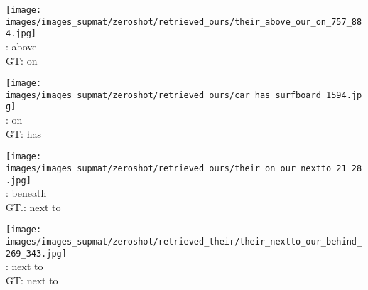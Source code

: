 \documentclass[10pt,twocolumn,letterpaper]{article}
\begin{document}
\begin{figure*}[t]
    \begin{minipage}[t]{0.185\textwidth}
    	\centering
       	\texttt{[image: images/images\_supmat/zeroshot/retrieved\_ours/their\_above\_our\_on\_757\_884.jpg]}\\
       	\vspace{0.3ex}
       	\cite{Lu16}: above \\
       	GT: on
       	\vspace{2ex}
    \end{minipage}
    \hspace{0.005\textwidth}
    \begin{minipage}[t]{0.185\textwidth}
    	\centering
       	\texttt{[image: images/images\_supmat/zeroshot/retrieved\_ours/car\_has\_surfboard\_1594.jpg]}\\
       	\vspace{0.3ex}
       	\cite{Lu16}: on \\
       	GT: has
       	\vspace{0.2ex}
    \end{minipage}
    \hspace{0.005\textwidth}
    \begin{minipage}[t]{0.185\textwidth}
       \centering
       \texttt{[image: images/images\_supmat/zeroshot/retrieved\_ours/their\_on\_our\_nextto\_21\_28.jpg]}\\
       \vspace{0.3ex}
       \cite{Lu16}: beneath \\
       GT.: next to
       \vspace{0.2ex}
    \end{minipage}
    \hspace{0.005\textwidth}
    \begin{minipage}[t]{0.185\textwidth}
    	\centering
       	\texttt{[image: images/images\_supmat/zeroshot/retrieved\_their/their\_nextto\_our\_behind\_269\_343.jpg]}\\
       	\vspace{0.3ex}
       	\cite{Lu16}: next to \\
       	GT: next to
       	\vspace{0.2ex}

\end{minipage}
\end{figure*}
\end{document}
